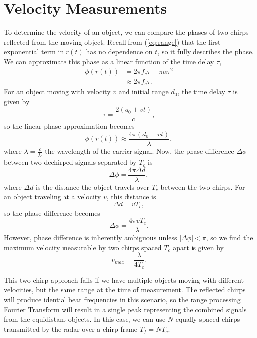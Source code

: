 \section{Velocity Measurements}
To determine the velocity of an object, we can compare the phases of two chirps
reflected from the moving object. Recall from (\ref{eq:range}) that the first
exponential term in $r(t)$ has no dependence on $t$, so it fully describes the phase. We
can approximate this phase as a linear function of the time delay $\tau$, 
\begin{align}
	\phi(r(t)) &= 2\pi f_c \tau - \pi \alpha \tau^2 \\
	&\approx 2\pi f_c \tau.
\end{align}
For an object moving with velocity $v$ and initial range $d_0$, the time delay
$\tau$ is given by 
\begin{equation}
	\tau = \frac{2(d_0 + vt)}{c}, \label{eq:moving-tau}
\end{equation}
so the linear phase approximation becomes
\begin{equation}
	\phi(r(t)) \approx \frac{4\pi(d_0 + vt)}{\lambda},
\end{equation}
where $\lambda = \frac{c}{f_c}$ the wavelength of
the carrier signal. Now, the phase difference $\Delta \phi$ between two
dechirped signals separated by
$T_c$ is
\begin{equation}
	\Delta\phi = \frac{4\pi \Delta d}{\lambda},
\end{equation}
where $\Delta d$ is the distance the object travels over $T_c$ between the two
chirps. For an object traveling at a velocity $v$, this distance is
\begin{equation}
	\Delta d = v T_c, 
\end{equation}
so the phase difference becomes
\begin{equation}
	\label{phase_diff}
	\Delta\phi = \frac{4\pi v T_c}{\lambda}.
\end{equation}
However, phase difference is inherently ambiguous unless $|\Delta\phi|<\pi$, so
we find the maximum velocity measurable by two chirps spaced $T_c$ apart is
given by
\begin{equation}
	v_{max} = \frac{\lambda}{4 T_c}.
\end{equation} 

This two-chirp approach fails if we have multiple objects moving with different
velocities, but the same range at the time of measurement. The reflected chirps
will produce idential beat frequencies in this scenario, so the range processing
Fourier Transform will result in a single peak representing the combined signals
from the equidistant objects. In this case, we can use $N$ equally spaced chirps 
transmitted by the radar over a chirp frame $T_f = NT_c$. 

